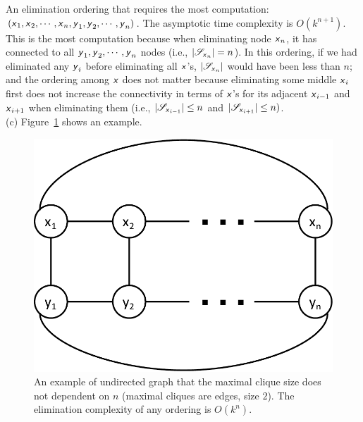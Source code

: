 \documentclass{article}
\newcommand{\s}[1]{\textsf{\textit{#1}}}
\begin{document}
An elimination ordering that requires the most computation:
$(\s{x}_1, \s{x}_2, \cdots, \s{x}_n, \s{y}_1, \s{y}_2, \cdots, \s{y}_n)$.
%
The asymptotic time complexity is $O(k^{n+1})$. This is the most computation because when eliminating node $\s{x}_n$,
it has connected to all $\s{y}_1, \s{y}_2, \cdots, \s{y}_n$ nodes (i.e., $|\mathscr{S}_{\s{x}_n}| = n$). In this ordering,
if we had eliminated any $\s{y}_i$ before eliminating all $\s{x}$'s, $|\mathscr{S}_{\s{x}_n}|$ would have been less than
$n$; and the ordering among $\s{x}$ does not matter because eliminating some middle $\s{x}_i$ first does not increase the
connectivity in terms of $\s{x}$'s for its adjacent $\s{x}_{i-1}$ and $\s{x}_{i+1}$ when eliminating them (i.e., $|\mathscr{S}_{\s{x}_{i-1}}| \leq n$ and $|\mathscr{S}_{\s{x}_{i+1}}| \leq n)$.
%
\\

%
\noindent
(c) Figure~\ref{f:3c} shows an example.
%
\begin{figure}[h]
  \centering
  \includegraphics[width=0.4\columnwidth]{3c.pdf}
  \vspace{-0.1cm}
  \caption{An example of undirected graph that the maximal clique size does not dependent on $n$ (maximal cliques
  are edges, size $2$). The elimination complexity of any ordering is $O(k^n)$.}
  \label{f:3c}
\end{figure}
%
 
\end{document}
